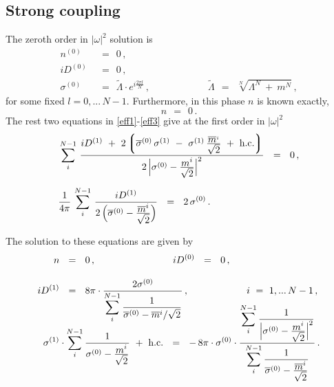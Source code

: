 \documentclass[epsfig,12pt]{article}
\newcommand{\wt}{\widetilde}
\newcommand{\ov}{\overline}
\newcommand{\lgr}{\left\lgroup}
\newcommand{\rgr}{\right\rgroup}
\newcommand{\nz}{{n^{(0)}}}
\newcommand{\Dz}{{D^{(0)}}}
\newcommand{\Do}{{D^{(1)}}}
\newcommand{\sigz}{{\sigma^{(0)}}}
\newcommand{\sigo}{{\sigma^{(1)}}}
\newcommand{\bsigz}{{\ov{\sigma}{}^{(0)}}}
\begin{document}
%
%
\subsection{Strong coupling}

	The zeroth order in $ |\omega|^2 $ solution is 
\begin{align*}
%
	\nz & ~~=~~ 0\,, \\[2mm]
%
	i \Dz & ~~=~~ 0\,, \\[2mm]
%
	\sigz & ~~=~~ \wt{\Lambda}\cdot e^{i\frac{2\pi l}{N}}\,,  
	\qquad\qquad\qquad
	\wt{\Lambda} ~~=~~ \sqrt[N]{ \Lambda^N ~+~ m^N }\,,
\end{align*}
	for some fixed $ l = 0,...\,N-1 $.
	Furthermore, in this phase  $ n $ is known exactly,
\[
	n ~~=~~ 0\,.
\]
	The rest two equations in \eqref{eff1}-\eqref{eff3} give at the first order in $ |\omega|^2 $
\begin{align*}
%
	&
	\sum_{i}^{N-1}\, \frac{ i \Do ~+~ 2 \lgr \bsigz\,\sigo ~-~ 
					\sigo\, \frac{\ov{\displaystyle m}{}^i}{\sqrt{\displaystyle 2}}
				~+~ \text{h.c.} \rgr }
			    { 2\, \Bigl| \sigz - \frac{\displaystyle m^i}{\sqrt{\displaystyle 2}} \Bigr|^2 }
			~~=~~ 0\,,
	\\[2mm]
%
	&
	\frac{1}{4\pi}\, \sum_i^{N-1}\, \frac{i \Do}
				    {2\,\Bigl( \bsigz - \frac{\displaystyle\ov{m}{}^i}{\displaystyle \sqrt{2}} \Bigr) }
			~~=~~ 2\, \sigz\,.
\end{align*}

	The solution to these equations are given by
\begin{align}
%
\notag
	n & ~~=~~ 0 \,,  \qquad\qquad\qquad\qquad i \Dz ~~=~~ 0\,,
	\\[3mm]
%
\label{strongeq}
	i \Do & ~~=~~ 8\pi \cdot \frac{ 2\sigz } 
			{\displaystyle \sum_{i}^{N-1} 
				\frac{1}{ \bsigz - \ov{m}{}^i/\sqrt{2}} } \,,
	\qquad\qquad\qquad i ~=~ 1,...\, N-1\,,
	\\[-8mm]
%
\notag
	\sigo & \cdot \sum_{i}^{N-1} \frac{1}
			{ \sigz - \frac{\displaystyle m^i}{\displaystyle\sqrt{2}} }
		~+~ \text{h.c.} ~~=~~
	-\, 8\pi \cdot \sigz \cdot 
	\frac{ \displaystyle \sum_{i}^{N-1} 
			\frac{1}{ \Bigl| \sigz - \frac{\displaystyle m^i}{\displaystyle\sqrt{2}} \Bigr|^2 } }
	  { \displaystyle \sum_{i}^{N-1} 
				\frac{1}{ \bsigz - \frac{\displaystyle \ov{m}{}^i}
							{\displaystyle \sqrt{2}} } }\,.
\end{align}
\end{document}
